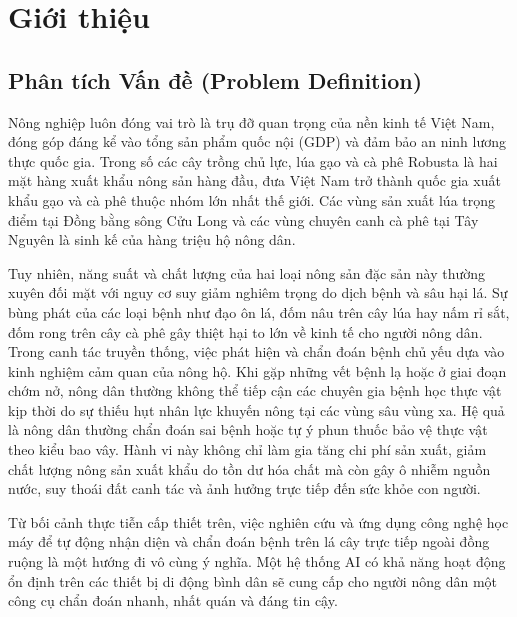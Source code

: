 \section{Giới thiệu}

\subsection{Phân tích Vấn đề (Problem Definition)}
Nông nghiệp luôn đóng vai trò là trụ đỡ quan trọng của nền kinh tế Việt Nam, đóng góp đáng kể vào tổng sản phẩm quốc nội (GDP) và đảm bảo an ninh lương thực quốc gia. Trong số các cây trồng chủ lực, lúa gạo và cà phê Robusta là hai mặt hàng xuất khẩu nông sản hàng đầu, đưa Việt Nam trở thành quốc gia xuất khẩu gạo và cà phê thuộc nhóm lớn nhất thế giới. Các vùng sản xuất lúa trọng điểm tại Đồng bằng sông Cửu Long và các vùng chuyên canh cà phê tại Tây Nguyên là sinh kế của hàng triệu hộ nông dân.

Tuy nhiên, năng suất và chất lượng của hai loại nông sản đặc sản này thường xuyên đối mặt với nguy cơ suy giảm nghiêm trọng do dịch bệnh và sâu hại lá. Sự bùng phát của các loại bệnh như đạo ôn lá, đốm nâu trên cây lúa hay nấm rỉ sắt, đốm rong trên cây cà phê gây thiệt hại to lớn về kinh tế cho người nông dân. Trong canh tác truyền thống, việc phát hiện và chẩn đoán bệnh chủ yếu dựa vào kinh nghiệm cảm quan của nông hộ. Khi gặp những vết bệnh lạ hoặc ở giai đoạn chớm nở, nông dân thường không thể tiếp cận các chuyên gia bệnh học thực vật kịp thời do sự thiếu hụt nhân lực khuyến nông tại các vùng sâu vùng xa. Hệ quả là nông dân thường chẩn đoán sai bệnh hoặc tự ý phun thuốc bảo vệ thực vật theo kiểu bao vây. Hành vi này không chỉ làm gia tăng chi phí sản xuất, giảm chất lượng nông sản xuất khẩu do tồn dư hóa chất mà còn gây ô nhiễm nguồn nước, suy thoái đất canh tác và ảnh hưởng trực tiếp đến sức khỏe con người.

Từ bối cảnh thực tiễn cấp thiết trên, việc nghiên cứu và ứng dụng công nghệ học máy để tự động nhận diện và chẩn đoán bệnh trên lá cây trực tiếp ngoài đồng ruộng là một hướng đi vô cùng ý nghĩa. Một hệ thống AI có khả năng hoạt động ổn định trên các thiết bị di động bình dân sẽ cung cấp cho người nông dân một công cụ chẩn đoán nhanh, nhất quán và đáng tin cậy.

